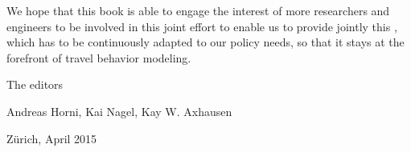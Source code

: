 We hope that this book is able to engage the interest of more researchers and engineers to be involved in this joint effort to enable us to provide jointly this , which has to be continuously adapted to our policy needs, so that it stays at the forefront of travel behavior modeling.

The editors

Andreas Horni, 	Kai Nagel,	Kay W. Axhausen


Zürich, April 2015

